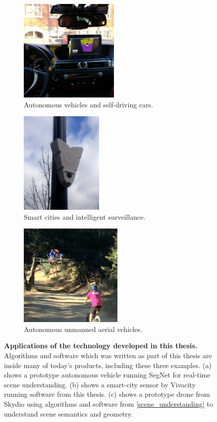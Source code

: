 \begin{figure}[t]
\center
    \begin{subfigure}[t]{0.32\textwidth}
        \centering
          \includegraphics[height=5cm]{toyota.jpg}
        \caption{Autonomous vehicles and self-driving cars.}
    \end{subfigure}
    \begin{subfigure}[t]{0.32\textwidth}
        \centering
          \includegraphics[height=5cm]{vivacity.jpg}
        \caption{Smart cities and intelligent surveillance.}
    \end{subfigure}
    \begin{subfigure}[t]{0.32\textwidth}
        \centering
          \includegraphics[height=5cm]{skydio.png}
        \caption{Autonomous unmanned aerial vehicles.}
    \end{subfigure}%
\caption[Applications of technology in this thesis]{\textbf{Applications of the technology developed in this thesis.} Algorithms and software which was written as part of this thesis are inside many of today's products, including these three examples. (a) shows a prototype autonomous vehicle running SegNet for real-time scene understanding. (b) shows a smart-city sensor by Vivacity \citep{vivacity} running software from this thesis. (c) shows a prototype drone from Skydio \citep{skydio} using algorithms and software from \cref{scene_understanding} to understand scene semantics and geometry.}
\label{ch6:applications}
\end{figure} 

